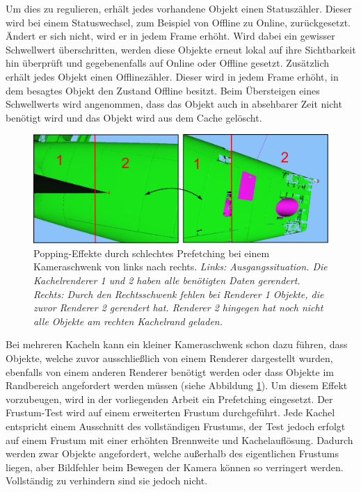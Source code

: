 Um dies zu regulieren, erhält jedes vorhandene Objekt einen Statuszähler. Dieser wird bei einem Statuswechsel, zum Beispiel von Offline zu Online, zurückgesetzt. Ändert er sich nicht, wird er in jedem Frame erhöht. Wird dabei ein gewisser Schwellwert überschritten, werden diese Objekte erneut lokal auf ihre Sichtbarkeit hin überprüft und gegebenenfalls auf Online oder Offline gesetzt. Zusätzlich erhält jedes Objekt einen Offlinezähler. Dieser wird in jedem Frame erhöht, in dem besagtes Objekt den Zustand Offline besitzt. Beim Übersteigen eines Schwellwerts wird angenommen, dass das Objekt auch in absehbarer Zeit nicht benötigt wird und das Objekt wird aus dem Cache gelöscht.
\begin{figure}
\centering
\includegraphics[width=\hsize]{images/prefetching.pdf}
\caption[Popping-Effekte durch schlechtes Prefetching.]{\label{fig:basics:prefetching}Popping-Effekte durch schlechtes Prefetching bei einem Kameraschwenk von links nach rechts. \textit{Links: Ausgangssituation. Die Kachelrenderer 1 und 2 haben alle benötigten Daten gerendert. Rechts: Durch den Rechtsschwenk fehlen bei Renderer 1 Objekte, die zuvor Renderer 2 gerendert hat. Renderer 2 hingegen hat noch nicht alle Objekte am rechten Kachelrand geladen.}}
\end{figure}

Bei mehreren Kacheln kann ein kleiner Kameraschwenk schon dazu führen, dass Objekte, welche zuvor ausschließlich von einem Renderer dargestellt wurden, ebenfalls von einem anderen Renderer benötigt werden oder dass Objekte im Randbereich angefordert werden müssen (siehe Abbildung \ref{fig:basics:prefetching}). Um diesem Effekt vorzubeugen, wird in der vorliegenden Arbeit ein Prefetching eingesetzt. Der Frustum-Test wird auf einem erweiterten Frustum durchgeführt. Jede Kachel entspricht einem Ausschnitt des vollständigen Frustums, der Test jedoch erfolgt auf einem Frustum mit einer erhöhten Brennweite und Kachelauflösung. Dadurch werden zwar Objekte angefordert, welche außerhalb des eigentlichen Frustums liegen, aber Bildfehler beim Bewegen der Kamera können so verringert werden. Vollständig zu verhindern sind sie jedoch nicht.



